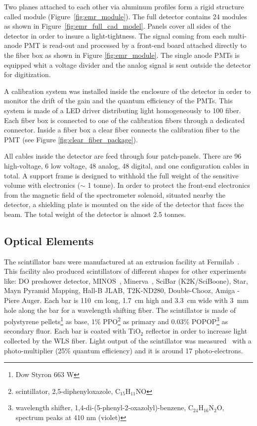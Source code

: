 \documentclass[a4paper,11pt]{article}
\begin{document}
Two planes attached to each other via aluminum profiles form a rigid structure called module (Figure~\ref{fig:emr_module}). 
The full detector contains 24 modules as shown in Figure~\ref{fig:emr_full_cad_model}. Panels cover all sides of the detector
in order to insure a light-tightness. The signal coming from each multi-anode PMT is read-out and processed by a front-end board
attached directly to the fiber box as shown in Figure \ref{fig:emr_module}. The single anode PMTs is equipped whit a
voltage divider and the analog signal is sent outside the detector for digitization.

A calibration system was installed inside the enclosure of the detector in order to monitor the drift of the gain and the quantum
efficiency of the PMTs. This system is made of a LED driver distributing light homogeneously to 100 fiber. Each fiber box is
connected to one of the calibration fibers through a dedicated connector. Inside a fiber box a clear fiber connects the calibration
fiber to the PMT (see Figure \ref{fig:clear_fiber_package}).

All cables inside the detector are feed through four patch-panels. There are 96 high-voltage, 6 low voltage, 48 analog, 48 digital,
and one configuration cables in total. A support frame is designed to withhold the full weight of the sensitive volume with electronics
($\sim$ 1 tonne). In order to protect the front-end electronics from the magnetic field of the spectrometer solenoid, situated nearby
the detector, a shielding plate is mounted on the side of the detector that faces the beam. The total weight of the detector is almost
2.5 tonnes.

\subsection{Optical Elements}
The scintillator bars were manufactured at an extrusion facility at Fermilab~\cite{PlaDalmau:2001fr}. This facility also produced
scintillators of different shapes for other experiments like: DO preshower detector, MINOS~\cite{PlaDalmau:2001en},
Minerva~\cite{PlaDalmau:2005df}, SciBar (K2K/SciBoone), Star, Mayn Pyramid Mapping, Hall-B JLAB, T2K-ND280, Double-Chooz, Amiga
- Piere Auger. Each bar is 110~cm long, 1.7~cm high and 3.3~cm wide with 3~mm hole along the bar for a wavelength shifting fiber.
The scintillator is made of polystyrene pellets\footnote{Dow Styron 663 W} as base, 1\% PPO\footnote{scintillator, 2,5-diphenyloxazole,
C$_{15}$H$_{11}$NO} as primary and 0.03\% POPOP\footnote{wavelength shifter, 1,4-di-(5-phenyl-2-oxazolyl)-benzene, C$_{24}$H$_{16}$N$_{2}$O,
spectrum peaks at 410 nm (violet)} as secondary fluor. Each bar is coated with TiO$_2$ reflector in order to increase light collected by 
the WLS fiber. Light output of the scintillator was measured~\cite{PlaDalmau:2001fr} with a photo-multiplier (25\% quantum efficiency)
and it is around 17 photo-electrons. 
\end{document}
